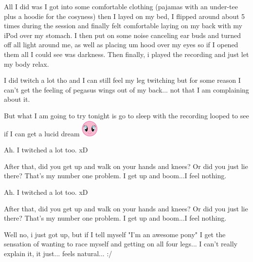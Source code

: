 \documentclass[ebook,12pt,oneside,openany]{memoir}
\begin{document}
\begin{tcolorbox}[title=Feather Gem]
\begin{tcolorbox}[title=Jordan Dash]
\par{All I did was I got into some comfortable clothing (pajamas with an under-tee plus a hoodie for the cosyness) then I layed on my bed, I flipped around about 5 times during the session and finally felt comfortable laying on my back with my iPod over my stomach. I then put on some noise canceling ear buds and turned off all light around me, as well as placing um hood over my eyes so if I opened them all I could see was darkness. Then finally, i played the recording and just let my body relax.}
\newline{}
\par{I did twitch a lot tho and I can still feel my leg twitching but for some reason I can't get the feeling of pegasus wings out of my back... not that I am complaining about it. }
\newline{}
\par{But what I am going to try tonight is go to sleep with the recording looped to see if I can get a lucid dream \includegraphics{images/mlp_smile.png}}
\end{tcolorbox}
\par{Ah.  I twitched a lot too.  xD}
\par{After that, did you get up and walk on your hands and knees?  Or did you just lie there?  That's my number one problem.  I get up and boom...I feel nothing.}
\end{tcolorbox}
\begin{tcolorbox}[title=Jordan Dash]
\begin{tcolorbox}[title=Feather Gem]
\par{Ah.  I twitched a lot too.  xD}
\par{After that, did you get up and walk on your hands and knees?  Or did you just lie there?  That's my number one problem.  I get up and boom...I feel nothing.}
\end{tcolorbox}
\par{Well no, i just got up, but if I tell myself "I'm an awesome pony" I get the sensation of wanting to race myself and getting on all four legs... I can't really explain it, it just... feels natural... :/}
\end{tcolorbox}
\end{document}
